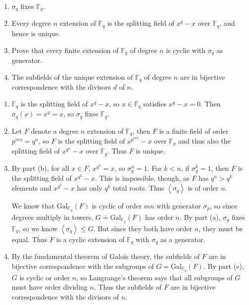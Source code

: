 \documentclass[10pt]{report}
\begin{document}
\begin{exer}[DF 14.3: 9]
\begin{enumerate}
	\item $\sigma_{q}$ fixes $\mathbb{F}_{q}$.
	\item Every degree $n$ extension of $\mathbb{F}_{q}$ is the splitting field of $x^q-x$ over $\mathbb{F}_{q}$, and hence is unique.
	\item Prove that every finite extension of $\mathbb{F}_{q}$ of degree $n$ is cyclic with $\sigma_{q}$ as generator.
	\item The subfields of the unique extension of $\mathbb{F}_{q}$ of degree $n$ are in bijective correspondence with the divisors $d$ of $n$.
\end{enumerate}
\end{exer}
\begin{enumerate}
	\item $\mathbb{F}_{q}$ is the splitting field of $x^q-x$, so $x \in \mathbb{F}_{q}$ satisfies $x^q-x=0$. Then $\sigma_{q}(x)=x^q=x$, so $\sigma_{q}$ fixes $\mathbb{F}_{q}$.
	\item Let $F$ denote a degree $n$ extension of $\mathbb{F}_{q}$, then $F$ is a finite field of order $p^{mn}=q^n$, so $F$ is the splitting field of $x^{p^{mn}}-x$ over $\mathbb{F}_{p}$ and thus also the splitting field of $x^{q^n}-x$ over $\mathbb{F}_{q}$. Thus $F$ is unique.
	\item By part (b), for all $x \in F$, $x^{q^n}=x$, so $\sigma_{q}^n=1$. For $k<n$, if $\sigma_{q}^k=1$, then $F$ is the splitting field of $x^{q^k}-x$. This is impossible, though, as $F$ has $q^n > q^k$ elements and $x^{q^k}-x$ has only $q^k$ total roots. Thus $\left\langle \sigma_{q} \right\rangle$ is of order $n$.

		We know that $\text{Gal}_{\mathbb{F}_{p}}(F)$ is cyclic of order $mn$ with generator $\sigma_{p}$, so since degrees multiply in towers, $G \doteq \text{Gal}_{\mathbb{F}_{q}}(F)$ has order $n$. By part (a), $\sigma_{q}$ fixes $\mathbb{F}_{q}$, so we know $\left\langle \sigma_{q} \right\rangle\leq G$. But since they both have order $n$, they must be equal. Thus $F$ is a cyclic extension of $\mathbb{F}_{q}$ with $\sigma_{q}$ as a generator.
	\item By the fundamental theorem of Galois theory, the subfields of $F$ are in bijective correspondence with the subgroups of $G = \text{Gal}_{\mathbb{F}_{q}}(F)$. By part (c), $G$ is cyclic or order $n$, so Langrange's theorem says that all subgroups of $G$ must have order dividing $n$. Thus the subfields of $F$ are in bijective correspondence with the divisors of $n$.
\end{enumerate}
\end{document}
